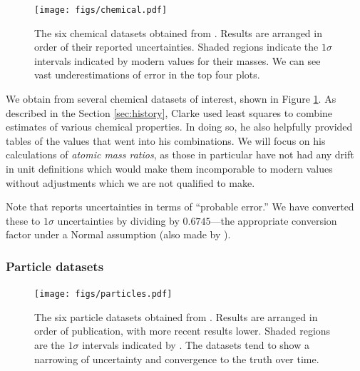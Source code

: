 \documentclass[12pt]{article}
\begin{document}
\begin{figure}
  \texttt{[image: figs/chemical.pdf]}
  \caption{The six chemical datasets obtained from \citet{clarke1910recalculation}. Results are arranged in order of their reported uncertainties. Shaded regions indicate the $1\sigma$ intervals indicated by modern values for their masses. We can see vast underestimations of error in the top four plots.}
  \label{fig:chemical}
\end{figure}

We obtain from \citet{clarke1910recalculation} several chemical datasets of interest, shown in Figure \ref{fig:chemical}. As described in the Section \ref{sec:history}, Clarke used least squares to combine estimates of various chemical properties. In doing so, he also helpfully provided tables of the values that went into his combinations. We will focus on his calculations of \textit{atomic mass ratios}, as those in particular have not had any drift in unit definitions which would make them incomporable to modern values without adjustments which we are not qualified to make.

Note that \citet{clarke1910recalculation} reports uncertainties in terms of ``probable error.'' We have converted these to $1\sigma$ uncertainties by dividing by $0.6745$---the appropriate conversion factor under a Normal assumption (also made by \citet{clarke1910recalculation}).

\subsubsection{Particle datasets}

\begin{figure}
  \texttt{[image: figs/particles.pdf]}
  \caption{The six particle datasets obtained from \citet{roos1970review}. Results are arranged in order of publication, with more recent results lower. Shaded regions are the $1\sigma$ intervals indicated by \citet{navas2024review}. The datasets tend to show a narrowing of uncertainty and convergence to the truth over time.}
  \label{fig:particle}
\end{figure}
\end{document}
